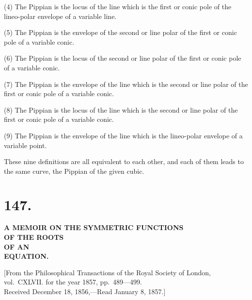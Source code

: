 \documentclass[11pt,a4paper]{book}
\begin{document}
\begin{center}
\hspace*{2em}(4) The Pippian is the locus of the line which is the first
or conic pole of the lineo-polar envelope of a variable line.

\hspace*{2em}(5) The Pippian is the envelope of the second or line polar
of the first or conic pole of a variable conic.

\hspace*{2em}(6) The Pippian is the locus of the second or line polar of
the first or conic pole of a variable conic.

\hspace*{2em}(7) The Pippian is the envelope of the line which is the
second or line polar of the first or conic pole of a variable conic.

\hspace*{2em}(8) The Pippian is the locus of the line which is the second
or line polar of the first or conic pole of a variable conic.

\hspace*{2em}(9) The Pippian is the envelope of the line which is the
lineo-polar envelope of a variable point.

\smallskip
These nine definitions are all equivalent to each other, and
each of them leads to the same curve, the Pippian of the given cubic.
\clearpage


\section*{147.}
\begin{center}
\Large\bfseries
A MEMOIR ON THE SYMMETRIC FUNCTIONS\\OF THE ROOTS\\OF AN\\EQUATION.
\end{center}

\begin{flushright}
\small
[From the Philosophical Transactions of the Royal Society of London,\\
vol.~CXLVII. for the year 1857, pp.~489---499.\\
Received December 18, 1856,---Read January 8, 1857.]
\end{flushright}


\end{center}
\end{document}
